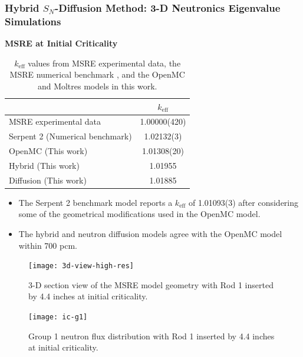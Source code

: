 \begin{frame}[noframenumbering]
  \frametitle{Hybrid $S_N$-Diffusion Method: 3-D Neutronics Eigenvalue Simulations}
  \textbf{MSRE at Initial Criticality}
  \begin{table}[htb]
    \centering
    \caption{$k_\text{eff}$ values from \gls{MSRE} experimental data, the \gls{MSRE} numerical
    benchmark \cite{fratoni_molten_2020}, and the OpenMC and Moltres models in this work.}
    \begin{tabular}{l S[table-format=1.5(2)]}
      \toprule
       & {$k_\text{eff}$} \\
       \midrule
      \gls{MSRE} experimental data & 1.00000(420) \\
      Serpent 2 (Numerical benchmark) & 1.02132(3) \\
      OpenMC (This work) & 1.01308(20) \\
      Hybrid (This work) & 1.01955 \\
      Diffusion (This work) & 1.01885 \\
      \bottomrule
    \end{tabular}
    \label{table:initial-crit}
  \end{table}

  \begin{itemize}
    \item The Serpent 2 benchmark model reports a $k_\text{eff}$ of 1.01093(3) after considering some
      of the geometrical modifications used in the OpenMC model.
    \item The hybrid and neutron diffusion models agree with the OpenMC model within 700 pcm.
  \end{itemize}
\end{frame}

\begin{frame}[noframenumbering]
  \begin{figure}[t]
    \centering
    \texttt{[image: 3d-view-high-res]}
    \caption{3-D section view of the \gls{MSRE} model geometry with Rod 1 inserted by 4.4 inches at
    initial criticality.}
    \label{fig:3d-view}
  \end{figure}
\end{frame}
  
\begin{frame}[noframenumbering]
  \begin{figure}[t]
    \centering
    \texttt{[image: ic-g1]}
    \caption{Group 1 neutron flux distribution with Rod 1 inserted by 4.4 inches at initial
    criticality.}
    \label{fig:ic-g1}
  \end{figure}
\end{frame}
  
